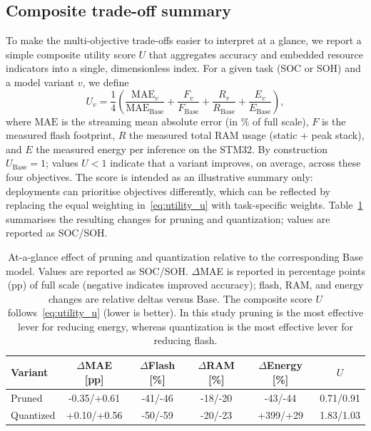 \documentclass[final,3p,times]{elsarticle}
\begin{document}
\subsection{Composite trade-off summary}
To make the multi-objective trade-offs easier to interpret at a glance, we report a simple composite utility score $U$ that aggregates accuracy and embedded resource indicators into a single, dimensionless index. For a given task (SOC or SOH) and a model variant $v$, we define
\begin{equation}
\label{eq:utility_u}
U_v = \frac{1}{4}\left(
\frac{\mathrm{MAE}_v}{\mathrm{MAE}_{\mathrm{Base}}} +
\frac{F_v}{F_{\mathrm{Base}}} +
\frac{R_v}{R_{\mathrm{Base}}} +
\frac{E_v}{E_{\mathrm{Base}}}
\right),
\end{equation}
where $\mathrm{MAE}$ is the streaming mean absolute error (in \% of full scale), $F$ is the measured flash footprint, $R$ the measured total RAM usage (static + peak stack), and $E$ the measured energy per inference on the STM32. By construction $U_{\mathrm{Base}}=1$; values $U<1$ indicate that a variant improves, on average, across these four objectives. The score is intended as an illustrative summary only: deployments can prioritise objectives differently, which can be reflected by replacing the equal weighting in~\eqref{eq:utility_u} with task-specific weights.
Table~\ref{tab:tradeoff_summary} summarises the resulting changes for pruning and quantization; values are reported as SOC/SOH.
\begin{table}[tbp]
    \centering
    \caption[Summary of pruning/quantization effects]{At-a-glance effect of pruning and quantization relative to the corresponding Base model. Values are reported as SOC/SOH. $\Delta$MAE is reported in percentage points (pp) of full scale (negative indicates improved accuracy); flash, RAM, and energy changes are relative deltas versus Base. The composite score $U$ follows~\eqref{eq:utility_u} (lower is better). In this study pruning is the most effective lever for reducing energy, whereas quantization is the most effective lever for reducing flash.}
    \label{tab:tradeoff_summary}
    \scriptsize
    \setlength{\tabcolsep}{2.5pt}
    \renewcommand{\arraystretch}{1.05}
    \begin{tabular}{lccccc}
        \toprule
        Variant & $\Delta$MAE [pp] & $\Delta$Flash [\%] & $\Delta$RAM [\%] & $\Delta$Energy [\%] & $U$ \\
        \midrule
        Pruned & \textcolor{mgGreen}{-0.35}/\textcolor{mgRed}{+0.61} & \textcolor{mgGreen}{-41}/\textcolor{mgGreen}{-46} & \textcolor{mgGreen}{-18}/\textcolor{mgGreen}{-20} & \textcolor{mgGreen}{-43}/\textcolor{mgGreen}{-44} & 0.71/0.91 \\
        Quantized & \textcolor{mgRed}{+0.10}/\textcolor{mgRed}{+0.56} & \textcolor{mgGreen}{-50}/\textcolor{mgGreen}{-59} & \textcolor{mgGreen}{-20}/\textcolor{mgGreen}{-23} & \textcolor{mgRed}{+399}/\textcolor{mgRed}{+29} & 1.83/1.03 \\
        \bottomrule
    \end{tabular}
\end{table}
\end{document}
